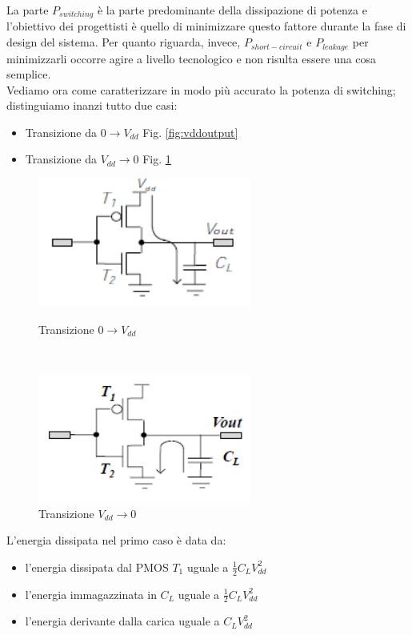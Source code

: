 La parte $P_{switching}$ è la parte predominante della dissipazione di potenza e l'obiettivo dei progettisti è quello di minimizzare questo fattore durante la fase di design del sistema. Per quanto riguarda, invece, $P_{short-circuit}$ e $P_{leakage}$ per minimizzarli occorre agire a livello tecnologico e non risulta essere una cosa semplice.\\
Vediamo ora come caratterizzare in modo più accurato la potenza di switching; distinguiamo inanzi tutto due casi:
\begin{itemize}
\item Transizione da $0 \rightarrow V_{dd}$ Fig. \ref{fig:vddoutput}
\item Transizione da $V_{dd} \rightarrow 0$ Fig. \ref{fig:ooutput}
\end{itemize}
\begin{figure}[hbt]
\begin{minipage}[b]{8cm}
\includegraphics[width=7cm]{img/vddoutput.png}
\caption{Transizione $0 \rightarrow V_{dd}$}\label{fig:vddoutput}
\end{minipage}
\ \hspace{2mm} \hspace{3mm} \
\begin{minipage}[b]{8cm}
\includegraphics[width=7cm]{img/ooutput.png}
\caption{Transizione $V_{dd} \rightarrow 0$}\label{fig:ooutput}
\end{minipage}
\end{figure}
L'energia dissipata nel primo caso è data da:
\begin{itemize}
\item l'energia dissipata dal PMOS $T_1$ uguale a $\frac{1}{2}C_LV_{dd}^2$
\item l'energia immagazzinata in $C_L$ uguale a $\frac{1}{2}C_LV_{dd}^2$
\item l'energia derivante dalla carica uguale a $C_LV_{dd}^2$
\end{itemize}
